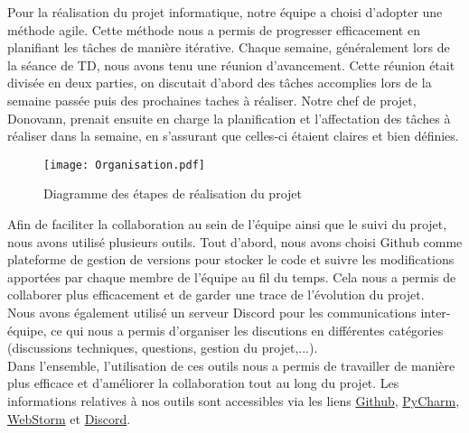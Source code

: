 Pour la réalisation du projet informatique, notre équipe a choisi d'adopter une méthode agile. Cette méthode nous a permis de progresser efficacement en planifiant les tâches de manière itérative. 
Chaque semaine, généralement lors de la séance de TD, nous avons tenu une réunion d'avancement. Cette réunion était divisée en deux parties, on discutait d'abord des tâches accomplies lors de la semaine passée puis des prochaines taches à réaliser. 
Notre chef de projet, Donovann, prenait ensuite en charge la planification et l'affectation des tâches à réaliser dans la semaine, en s'assurant que celles-ci étaient claires et bien définies.

\vspace{3mm}
\begin{figure}[H]
\texttt{[image: Organisation.pdf]}
\caption{Diagramme des étapes de réalisation du projet}
\end{figure}
\vspace{2mm}

Afin de faciliter la collaboration au sein de l'équipe ainsi que le suivi du projet, nous avons utilisé plusieurs outils. Tout d'abord, nous avons choisi Github comme plateforme de gestion de versions pour stocker le code et suivre les modifications apportées par chaque membre de l'équipe au fil du temps. Cela nous a permis de collaborer plus efficacement et de garder une trace de l'évolution du projet.\\

Nous avons également utilisé un serveur Discord pour les communications inter-équipe, ce qui nous a permis d'organiser les discutions en différentes catégories (discussions techniques, questions, gestion du projet,...).\\

Dans l'ensemble, l'utilisation de ces outils nous a permis de travailler de manière plus efficace et d'améliorer la collaboration tout au long du projet. Les informations relatives à nos outils sont accessibles via les liens \href{https://github.com/}{Github}, \href{https://www.jetbrains.com/fr-fr/pycharm/}{PyCharm}, \href{https://www.jetbrains.com/fr-fr/webstorm/}{WebStorm} et \href{https://discord.com/}{Discord}.



